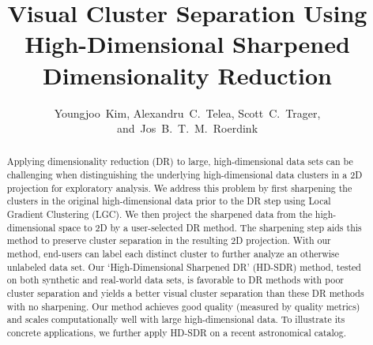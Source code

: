 \documentclass[sagev,Afour,times]{sagej}
\begin{document}

\title{Visual Cluster Separation Using High-Dimensional Sharpened Dimensionality Reduction}

\author{Youngjoo~Kim,
        Alexandru~C.~Telea,
         Scott~C.~Trager,
         and~Jos~B.~T.~M.~Roerdink}


 

\begin{abstract}
Applying dimensionality reduction (DR) to large, high-dimensional data sets can be challenging when distinguishing the underlying high-dimensional data clusters in a 2D projection for exploratory analysis. We address this problem by first sharpening the clusters in the original high-dimensional data prior to the DR step using Local Gradient Clustering (LGC). We then project the sharpened data from the high-dimensional space to 2D by a user-selected DR method. The sharpening step aids this method to preserve cluster separation in the resulting 2D projection. With our method, end-users can label each distinct cluster to further analyze an otherwise unlabeled data set. Our `High-Dimensional Sharpened DR' (HD-SDR) method, tested on both synthetic and real-world data sets, is favorable to DR methods with poor cluster separation and yields a better visual cluster separation than these DR methods with no sharpening. Our method achieves good quality (measured by quality metrics) and scales computationally well with large high-dimensional data. To illustrate its concrete applications, we further apply HD-SDR on a recent astronomical catalog.
\end{abstract}


\maketitle
\end{document}
